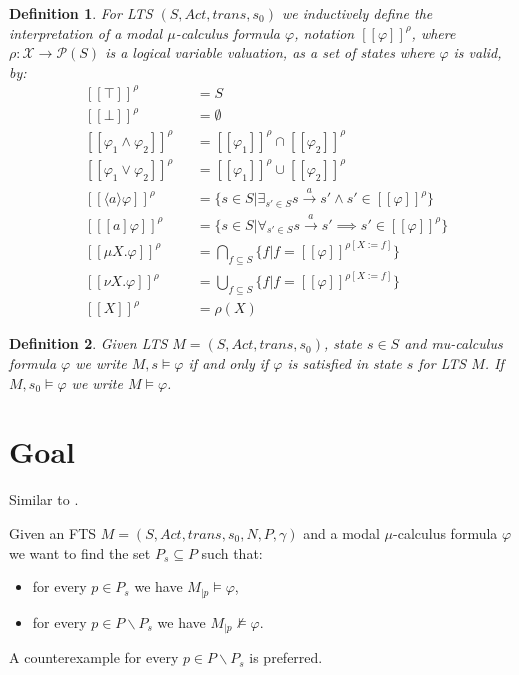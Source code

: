 \documentclass[]{article}
\newtheorem{definition}{Definition}[section]
\begin{document}
\begin{definition} 
	\label{def_mu_sem}\cite{Groote} For LTS $(S, Act, trans, s_0)$ we inductively define the interpretation of a modal $\mu$-calculus formula $\varphi$, notation
	$[\![ \varphi ]\!]^\rho$, where $\rho : \mathcal{X} \rightarrow \mathcal{P}(S)$ is a logical variable valuation, as a set of states
	where $\varphi$ is valid, by:
	\begin{align*}
	&[\![ \mathit{\top} ]\!]^\rho &&= S\\
	&[\![ \mathit{\bot} ]\!]^\rho &&= \emptyset\\
	&[\![ \varphi_1 \wedge \varphi_2 ]\!]^\rho &&= [\![ \varphi_1 ]\!]^\rho \cap [\![ \varphi_2 ]\!]^\rho \\
	&[\![ \varphi_1 \vee \varphi_2 ]\!]^\rho &&= [\![ \varphi_1 ]\!]^\rho \cup [\![ \varphi_2 ]\!]^\rho\\
	&[\![ \langle a \rangle \varphi ]\!]^\rho &&= \{s \in S|\exists_{s' \in S} s \xrightarrow {a} s' \wedge s' \in [\![ \varphi ]\!]^\rho\}\\
	&[\![ [ a ] \varphi ]\!]^\rho &&= \{s \in S|\forall_{s' \in S} s \xrightarrow {a} s' \implies s' \in [\![ \varphi ]\!]^\rho\}\\
	&[\![ \mu X. \varphi ]\!]^\rho &&= \bigcap_{f \subseteq S}\{f | f = [\![ \varphi ]\!]^{\rho[X:=f]}\}\\
	&[\![ \nu X. \varphi ]\!]^\rho &&= \bigcup_{f \subseteq S}\{f | f = [\![ \varphi ]\!]^{\rho[X:=f]}\}\\
	&[\![ X ]\!]^\rho &&= \rho(X)
	\end{align*}
\end{definition}
\begin{definition}
	\label{def_sat}
	Given LTS $M = (S, Act, trans, s_0)$, state $s \in S$ and mu-calculus formula $\varphi$ we write $M,s \models \varphi$ if and only if $\varphi$ is satisfied in state $s$ for LTS $M$. If $M, s_0 \models \varphi$ we write $M \models \varphi$.
\end{definition}
\section{Goal}
Similar to \cite{inproceedings}.

Given an FTS $M = (S, Act, trans, s_0, N, P, \gamma)$ and a modal $\mu$-calculus formula $\varphi$ we want to find the set $P_s \subseteq P$ such that:
\begin{itemize}
	\item for every $p \in P_s$ we have $M_{|p} \models \varphi$,
	\item for every $p \in P \backslash P_s$ we have $M_{|p} \not\models \varphi$.
\end{itemize}
A counterexample for every $p \in P \backslash P_s$ is preferred.
\end{document}
